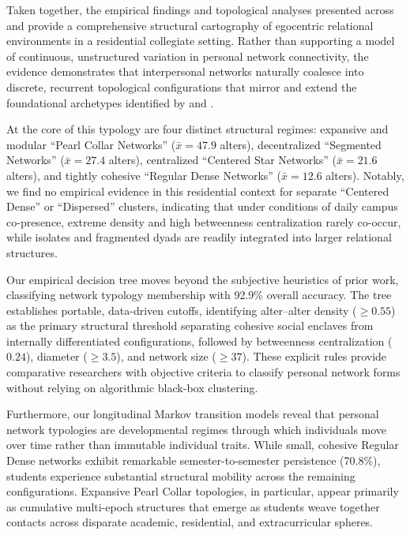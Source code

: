 \documentclass[12pt]{article}
\newcommand{\xbar}{\bar{x}}
\begin{document}
Taken together, the empirical findings and topological analyses presented across  and  provide a comprehensive structural cartography of egocentric relational environments in a residential collegiate setting. Rather than supporting a model of continuous, unstructured variation in personal network connectivity, the evidence demonstrates that interpersonal networks naturally coalesce into discrete, recurrent topological configurations that mirror and extend the foundational archetypes identified by \citet{bidart2018personal} and \citet{vacca2020structure}.

At the core of this typology are four distinct structural regimes: expansive and modular ``Pearl Collar Networks'' ($\xbar = 47.9$ alters), decentralized ``Segmented Networks'' ($\xbar = 27.4$ alters), centralized ``Centered Star Networks'' ($\xbar = 21.6$ alters), and tightly cohesive ``Regular Dense Networks'' ($\xbar = 12.6$ alters). Notably, we find no empirical evidence in this residential context for separate ``Centered Dense'' or ``Dispersed'' clusters, indicating that under conditions of daily campus co-presence, extreme density and high betweenness centralization rarely co-occur, while isolates and fragmented dyads are readily integrated into larger relational structures.

Our empirical decision tree moves beyond the subjective heuristics of prior work, classifying network typology membership with 92.9\% overall accuracy. The tree establishes portable, data-driven cutoffs, identifying alter--alter density ($\ge 0.55$) as the primary structural threshold separating cohesive social enclaves from internally differentiated configurations, followed by betweenness centralization ($0.24$), diameter ($\ge 3.5$), and network size ($\ge 37$). These explicit rules provide comparative researchers with objective criteria to classify personal network forms without relying on algorithmic black-box clustering.

Furthermore, our longitudinal Markov transition models reveal that personal network typologies are developmental regimes through which individuals move over time rather than immutable individual traits. While small, cohesive Regular Dense networks exhibit remarkable semester-to-semester persistence (70.8\%), students experience substantial structural mobility across the remaining configurations. Expansive Pearl Collar topologies, in particular, appear primarily as cumulative multi-epoch structures that emerge as students weave together contacts across disparate academic, residential, and extracurricular spheres.
\end{document}
